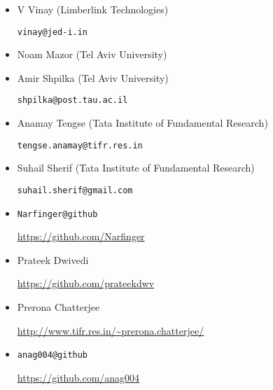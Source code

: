 \begin{itemize}
\item V Vinay (Limberlink Technologies)

\texttt{vinay@jed-i.in}

\item Noam Mazor (Tel Aviv University)

\item Amir Shpilka (Tel Aviv University)

\texttt{shpilka@post.tau.ac.il}

\item Anamay Tengse (Tata Institute of Fundamental Research)

\texttt{tengse.anamay@tifr.res.in}

\item Suhail Sherif (Tata Institute of Fundamental Research)

\texttt{suhail.sherif@gmail.com}

\item \texttt{Narfinger@github}

  \url{https://github.com/Narfinger}

\item Prateek Dwivedi

  \url{https://github.com/prateekdwv}

\item Prerona Chatterjee

  \url{http://www.tifr.res.in/~prerona.chatterjee/}

\item \texttt{anag004@github}

  \url{https://github.com/anag004}
  
\end{itemize}


